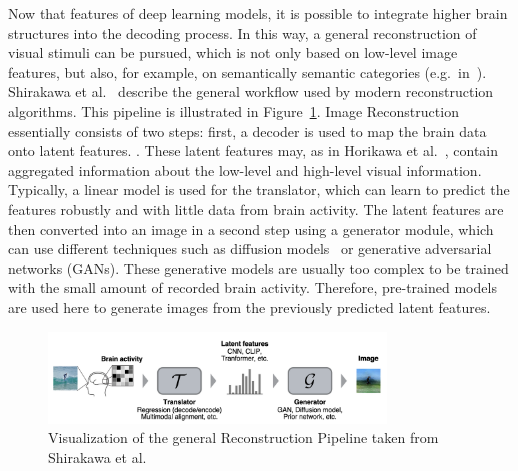 Now that features of deep learning models, it is possible to integrate higher brain structures into the decoding process. In this way, a general reconstruction of visual stimuli can be pursued, which is not only based on low-level image features, but also, for example, on semantically semantic categories (e.g.\ in~\cite{shenDeepImageReconstruction2019,ozcelikNaturalSceneReconstruction2023}). Shirakawa et al.~\cite{shirakawaSpuriousReconstructionBrain2024} describe the general workflow used by modern reconstruction algorithms. This pipeline is illustrated in Figure~\ref{fig:recon_pipeline}. Image Reconstruction essentially consists of two steps: first, a decoder is used to map the brain data onto latent features. . These latent features may, as in Horikawa et al.~\cite{horikawaGenericDecodingSeen2017}, contain aggregated information about the low-level and high-level visual information. Typically, a linear model is used for the translator, which can learn to predict the features robustly and with little data from brain activity. The latent features are then converted into an image in a second step using a generator module, which can use different techniques such as diffusion models~\cite{xuVersatileDiffusionText2024,ozcelikNaturalSceneReconstruction2023} or generative adversarial networks (GANs). These generative models are usually too complex to be trained with the small amount of recorded brain activity. Therefore, pre-trained models are used here to generate images from the previously predicted latent features.

\begin{figure}[ht]
    \centering
    \includegraphics[width=0.8\textwidth]{plots/01_background_shirakawa_recon_pipeline.png}
    \caption[General Reconstruction Pipeline]{Visualization of the general Reconstruction Pipeline taken from Shirakawa et al.~\cite{shirakawaSpuriousReconstructionBrain2024}}\label{fig:recon_pipeline}
\end{figure}

